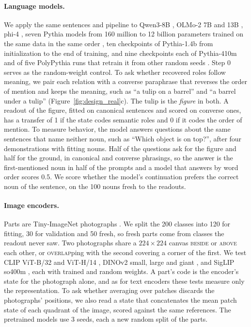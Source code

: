 \documentclass[10pt]{article}
\theoremstyle{plain}
\theoremstyle{remark}
\begin{document}
\paragraph{Language models.} We apply the same sentences and pipeline to Qwen3-8B \citep{yang2025qwen3}, OLMo-2 7B and 13B \citep{olmo2024olmo2}, phi-4 \citep{abdin2024phi4}, seven Pythia models from 160 million to 12 billion parameters trained on the same data in the same order \citep{biderman2023pythia}, ten checkpoints of Pythia-1.4b from initialization to the end of training, and nine checkpoints each of Pythia-410m and of five PolyPythia runs that retrain it from other random seeds \citep{vanderwal2025polypythias}. Step 0 serves as the random-weight control. To ask whether recovered roles follow meaning, we pair each relation with a converse paraphrase that reverses the order of mention and keeps the meaning, such as ``a tulip on a barrel'' and ``a barrel under a tulip'' (Figure~\ref{fig:design_real}c). The tulip is the \emph{figure} in both. A readout of the figure, fitted on canonical sentences and scored on converse ones, has a transfer of 1 if the state codes semantic roles and 0 if it codes the order of mention. To measure behavior, the model answers questions about the same sentences that name neither noun, such as ``Which object is on top?'', after four demonstrations with fitting nouns. Half of the questions ask for the figure and half for the ground, in canonical and converse phrasings, so the answer is the first-mentioned noun in half of the prompts and a model that answers by word order scores 0.5. We score whether the model's continuation prefers the correct noun of the sentence, on the 100 nouns fresh to the readouts.

\paragraph{Image encoders.} Parts are Tiny-ImageNet photographs \citep{le2015tiny}. We split the 200 classes into 120 for fitting, 30 for validation and 50 fresh, so fresh parts come from classes the readout never saw. Two photographs share a $224 \times 224$ canvas \textsc{beside} or \textsc{above} each other, or \textsc{overlap}ping with the second covering a corner of the first. We test CLIP ViT-B/32 and ViT-H/14 \citep{radford2021clip,cherti2023}, DINOv2 small, large and giant \citep{oquab2024dinov2}, and SigLIP so400m \citep{zhai2023siglip}, each with trained and random weights. A part's code is the encoder's state for the photograph alone, and as for text encoders these tests measure only the representation. To ask whether averaging over patches discards the photographs' positions, we also read a state that concatenates the mean patch state of each quadrant of the image, scored against the same references. The pretrained models use 3 seeds, each a new random split of the parts.
\end{document}
